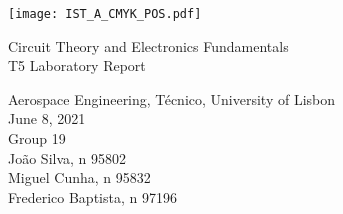 
\thispagestyle {empty}

\texttt{[image: IST\_A\_CMYK\_POS.pdf]}

\begin{center}
%
\vspace{1.0cm}

\vspace{1cm}
{\FontLb Circuit Theory and Electronics Fundamentals} \\ %
\vspace{3cm}
{\FontSn T5 Laboratory Report} %
\vspace{3cm}
\par
{\FontSn Aerospace Engineering, Técnico, University of Lisbon} \\
\vspace{1cm}
{\FontSn June 8, 2021}\\ %
%

\vspace{1.5cm}
{\FontLb Group 19} \\
\vspace{1cm}
{\FontSn João Silva, n 95802} \\
{\FontSn Miguel Cunha, n 95832} \\
{\FontSn Frederico Baptista, n 97196} \\

\newpage
\end{center}
